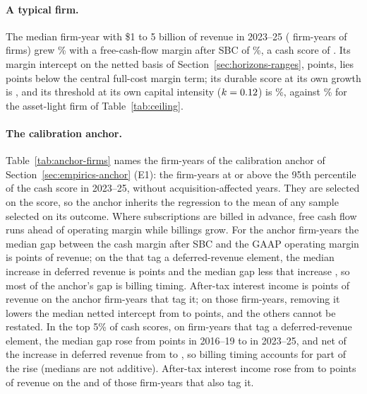 \paragraph{A typical firm.}\label{app:data-typical} The median firm-year with \$1 to 5 billion of revenue in 2023--25 (\TypN{} firm-years of \TypFirms{} firms) grew \TypG\% with a free-cash-flow margin after SBC of \TypMargin\%, a cash score of \TypScore. Its margin intercept on the netted basis of Section~\ref{sec:horizons-ranges}, \TypMzeroNet{} points, lies \TypGapNet{} points below the central full-cost margin term; its durable score at its own growth is \TypDurNet, and its threshold at its own capital intensity ($k=0.12$) is \TypGstarK\%, against \GstarCenOne\% for the asset-light firm of Table~\ref{tab:ceiling}.

\paragraph{The calibration anchor.} Table~\ref{tab:anchor-firms} names the firm-years of the calibration anchor of Section~\ref{sec:empirics-anchor} (E1): the firm-years at or above the 95th percentile of the cash score in 2023--25, without acquisition-affected years. They are selected on the score, so the anchor inherits the regression to the mean of any sample selected on its outcome. Where subscriptions are billed in advance, free cash flow runs ahead of operating margin while billings grow. For the \AnchorN{} anchor firm-years the median gap between the cash margin after SBC and the GAAP operating margin is \WedgeAnchor{} points of revenue; on the \WedgeAnchorNDdr{} that tag a deferred-revenue element, the median increase in deferred revenue is \WedgeAnchorDdr{} points and the median gap less that increase \WedgeAnchorLessDdr, so most of the anchor's gap is billing timing. After-tax interest income is \WedgeAnchorIi{} points of revenue on the \WedgeAnchorNIi{} anchor firm-years that tag it; on those firm-years, removing it lowers the median netted intercept from \AnchorIiMzeroSame{} to \AnchorIiMzero{} points, and the others cannot be restated. In the top 5\% of cash scores, on firm-years that tag a deferred-revenue element, the median gap rose from \WedgeOnDdrEarly{} points in 2016--19 to \WedgeOnDdrLate{} in 2023--25, and net of the increase in deferred revenue from \WedgeLessDdrEarly{} to \WedgeLessDdrLate, so billing timing accounts for part of the rise (medians are not additive). After-tax interest income rose from \WedgeIiEarly{} to \WedgeIiLate{} points of revenue on the \WedgeNIiEarly{} and \WedgeNIiLate{} of those firm-years that also tag it.

